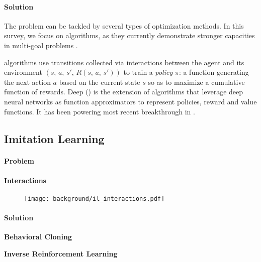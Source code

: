 \paragraph{Solution}

The \rl problem can be tackled by several types of optimization methods. In this survey, we focus on \rl
algorithms, as they currently demonstrate stronger capacities in multi-goal problems \cite{goalgan,eysenbach2018diversity,warde2018unsupervised,pong2019skew,lynch2020grounding,hill_human_2020,hill_grounded_2020,abramson_imitating_2020,imagine,team2021open}.

\rl algorithms use transitions collected via interactions between the agent and its environment $(s,\,a,\,s',\,R(s,\,a,\,s'))$ to train a \textit{policy} $\pi$: a function generating the next action $a$ based on the current state $s$ so as to maximize a cumulative function of rewards. Deep \rl  (\drl) is the extension of \rl algorithms that leverage deep neural networks as function approximators to represent policies, reward and value functions. It has been powering most recent breakthrough in \rl  \cite{eysenbach2018diversity,warde2018unsupervised,goalgan,pong2019skew,lynch2020grounding,hill_human_2020,hill_grounded_2020,abramson_imitating_2020,imagine,team2021open}.


\subsection{Imitation Learning}

\paragraph{Problem}

\paragraph{Interactions}

\begin{figure}[!h]
\centering
\texttt{[image: background/il\_interactions.pdf]}	
\caption{}
\label{fig:il_interacvtions}
\end{figure}


\paragraph{Solution}

\textbf{Behavioral Cloning}

\textbf{Inverse Reinforcement Learning}

